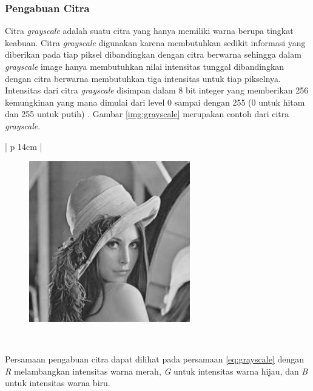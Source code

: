\subsubsection{Pengabuan Citra}
Citra \textit{grayscale} adalah suatu citra yang hanya memiliki warna berupa tingkat keabuan. Citra \textit{grayscale} digunakan karena membutuhkan sedikit informasi yang diberikan pada tiap piksel dibandingkan dengan citra berwarna sehingga dalam \textit{grayscale} image hanya membutuhkan nilai intensitas tunggal dibandingkan dengan citra berwarna membutuhkan tiga intensitas untuk tiap pikselnya. Intensitas dari citra \textit{grayscale} disimpan dalam 8 bit integer yang memberikan 256 kemungkinan yang mana dimulai dari level 0 sampai dengan 255 (0 untuk hitam dan 255 untuk putih) \cite{gonzalez}. Gambar \ref{img:grayscale} merupakan contoh dari citra \textit{grayscale}.

\begin{table}[H]
	\small
	\begin{adjustbox}{width=1\textwidth}
		\begin{tabular}{| p {14cm} |}
			\hline
			\begin{figure}[H]
				\centering
				\includegraphics[width=7cm]{images/grayscale.jpg}
			\end{figure} \\
			\hline
		\end{tabular}
	\end{adjustbox}
	\label{img:grayscale}
\end{table}

Persamaan pengabuan citra dapat dilihat pada persamaan \ref{eq:grayscale} dengan \textit{R} melambangkan intensitas warna merah, \textit{G} untuk intensitas warna hijau, dan \textit{B} untuk intensitas warna biru. 

